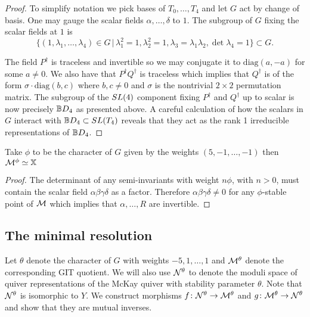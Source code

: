 \documentclass{amsart}
\theoremstyle{definition}
\begin{document}
\begin{proof}
To simplify notation we pick bases of $T_0, \ldots, T_4$ and let $G$ act by change of basis. 
One may gauge the scalar fields $\alpha, \ldots, \delta$ to $1$.
The subgroup of $G$ fixing the scalar fields at $1$ is $$\{(1,\lambda_1, \ldots, \lambda_4) \in G \,|\, \lambda_1^2=1, \lambda_2^2=1, \lambda_3 = \lambda_1\lambda_2, \det\lambda_4=1\} \subset G.$$

The field $P^\dagger$ is traceless and invertible so we may conjugate it to $\text{diag}(a, -a)$ for some $a \neq 0$.
We also have that $P^\dagger Q^\dagger$ is traceless which implies that $Q^\dagger$ is of the form $\sigma \cdot \text{diag}(b,c)$ where $b,c \neq 0$ and $\sigma$ is the nontrivial $2\times2$ permutation matrix.
The subgroup of the $SL(4)$ component fixing $P^\dagger$ and $Q^\dagger$ up to scalar is now precisely $\mathbb{B} D_4$ as presented above.
A careful calculation of how the scalars in $G$ interact with $\mathbb{B} D_4 \subset SL(T_4)$ reveals that they act as the rank 1 irreducible representations of $\mathbb{B} D_4$.
\end{proof}

\begin{corollary}
Take $\phi$ to be the character of $G$ given by the weights $(5, -1,\ldots, -1)$ then $\mathcal{M}^\phi \simeq \mathbb{X}$
\end{corollary}

\begin{proof}
The determinant of any semi-invariants with weight $n \phi$, with $n>0$, must contain the scalar field $\alpha \beta \gamma \delta$ as a factor.
Therefore $\alpha \beta \gamma \delta \neq 0$ for any $\phi$-stable point of $\mathcal{M}$ which implies that $\alpha, \ldots, R$ are invertible.  
\end{proof}

\subsection{The minimal resolution}

Let $\theta$ denote the character of $G$ with weights $-5,1,\ldots,1$ and $\mathcal{M}^\theta$ denote the corresponding GIT quotient.
We will also use $\mathcal{N}^\theta$ to denote the moduli space of quiver representations of the McKay quiver with stability parameter $\theta$.
Note that $\mathcal{N}^\theta$ is isomorphic to $Y$.
We construct morphisms $f \colon \mathcal{N}^\theta \rightarrow \mathcal{M}^\theta$ and $g \colon \mathcal{M}^\theta \rightarrow \mathcal{N}^\theta$ and show that they are mutual inverses.
\end{document}
